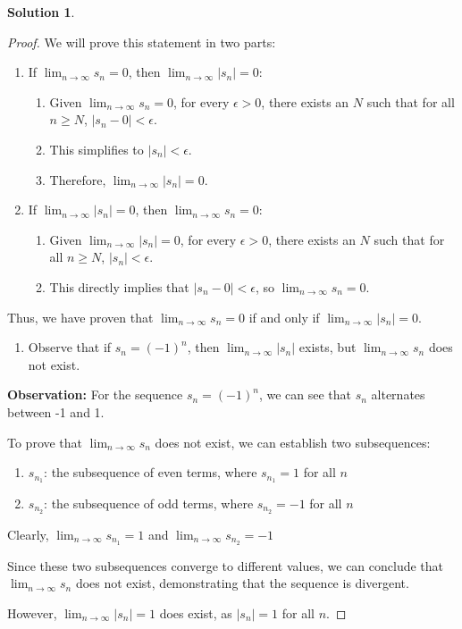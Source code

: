 \documentclass[12pt]{article}
\theoremstyle{definition} %
\newtheorem{solution}{Solution}
\theoremstyle{plain} %
\begin{document}
  \begin{solution}
     \begin{proof}
      We will prove this statement in two parts:
  \begin{enumerate}
      \item If $\lim_{n \to \infty} s_n = 0$, then $\lim_{n \to \infty} |s_n| = 0$:
      \begin{enumerate}
          \item Given $\lim_{n \to \infty} s_n = 0$, for every $\epsilon > 0$, there exists an $N$ such that for all $n \geq N$, $|s_n - 0| < \epsilon$.
          \item This simplifies to $|s_n| < \epsilon$.
          \item Therefore, $\lim_{n \to \infty} |s_n| = 0$.
      \end{enumerate}
      \item If $\lim_{n \to \infty} |s_n| = 0$, then $\lim_{n \to \infty} s_n = 0$:
      \begin{enumerate}
          \item Given $\lim_{n \to \infty} |s_n| = 0$, for every $\epsilon > 0$, there exists an $N$ such that for all $n \geq N$, $|s_n| < \epsilon$.
          \item This directly implies that $|s_n - 0| < \epsilon$, so $\lim_{n \to \infty} s_n = 0$.
      \end{enumerate}
  \end{enumerate}
  Thus, we have proven that $\lim_{n \to \infty} s_n = 0$ if and only if $\lim_{n \to \infty} |s_n| = 0$. 
  
  \begin{enumerate}[resume]
      \item Observe that if $s_{n}=(-1)^n$, then $\lim_{ n \to \infty }|s_{n}|$ exists, but $\lim_{ n \to \infty }s_{n}$ does not exist.
  \end{enumerate}
  
  \textbf{Observation:} For the sequence $s_n = (-1)^n$, we can see that $s_n$ alternates between -1 and 1.
  
  To prove that $\lim_{n \to \infty} s_n$ does not exist, we can establish two subsequences:
  \begin{enumerate}
      \item $s_{n_1}$: the subsequence of even terms, where $s_{n_1} = 1$ for all $n$
      \item $s_{n_2}$: the subsequence of odd terms, where $s_{n_2} = -1$ for all $n$
  \end{enumerate}
  
  Clearly, $\lim_{n \to \infty} s_{n_1} = 1$ and $\lim_{n \to \infty} s_{n_2} = -1$
  
  Since these two subsequences converge to different values, we can conclude that $\lim_{n \to \infty} s_n$ does not exist, demonstrating that the sequence is divergent.
  
  However, $\lim_{n \to \infty} |s_n| = 1$ does exist, as $|s_n| = 1$ for all $n$.
  
     \end{proof} 
  \end{solution}
  
\end{document}
